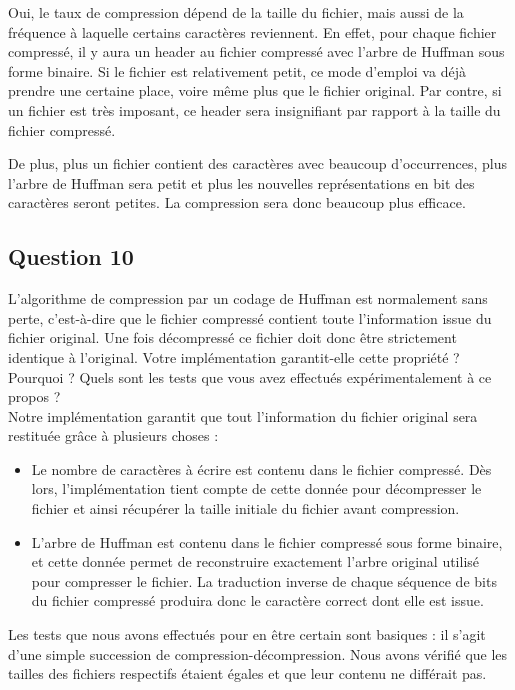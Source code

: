 \documentclass[11pt]{article}
\begin{document}
Oui, le taux de compression dépend de la taille du fichier, mais aussi de la fréquence à laquelle certains caractères	reviennent. En effet, pour chaque fichier compressé, il y aura un header au fichier compressé avec l'arbre de Huffman sous forme binaire. Si le fichier est relativement petit, ce mode d'emploi va déjà prendre une certaine place, voire même plus que le fichier original. Par contre, si un fichier est très imposant, ce header sera insignifiant par rapport à la taille du fichier compressé.

De plus, plus un fichier contient des caractères avec beaucoup d'occurrences, plus l'arbre de Huffman sera petit et plus les nouvelles représentations en bit des caractères seront petites. La compression sera donc beaucoup plus efficace.

\subsection*{Question 10}
L'algorithme de compression par un codage de Huffman est normalement sans perte, c'est-à-dire que le fichier compressé contient toute l'information issue du fichier original. Une fois décompressé ce fichier doit donc être strictement identique à l'original. Votre implémentation garantit-elle cette propriété ? Pourquoi ? Quels sont les tests que vous avez effectués expérimentalement à ce propos ? \\

Notre implémentation garantit que tout l'information du fichier original sera restituée grâce à plusieurs choses : \\

\begin{itemize}
	\item Le nombre de caractères à écrire est contenu dans le fichier compressé. Dès lors, l'implémentation tient compte de cette donnée pour décompresser le fichier et ainsi récupérer la taille initiale du fichier avant compression.
	\item L'arbre de Huffman est contenu dans le fichier compressé sous forme binaire, et cette donnée permet de reconstruire exactement l'arbre original utilisé pour compresser le fichier. La traduction inverse de chaque séquence de bits du fichier compressé produira donc le caractère correct dont elle est issue.\\
\end{itemize}

Les tests que nous avons effectués pour en être certain sont basiques : il s'agit d'une simple succession de compression-décompression. Nous avons vérifié que les tailles des fichiers respectifs étaient égales et que leur contenu ne différait pas. \\
\end{document}

